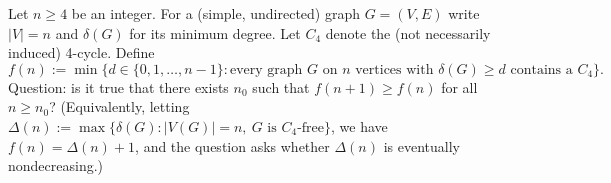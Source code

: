 Let $n\ge 4$ be an integer. For a (simple, undirected) graph $G=(V,E)$ write $|V|=n$ and $\delta(G)$ for its minimum degree. Let $C_4$ denote the (not necessarily induced) 4-cycle.
Define
\[
 f(n) := \min\big\{ d\in\{0,1,\dots,n-1\} : \text{every graph }G\text{ on }n\text{ vertices with }\delta(G)\ge d\text{ contains a }C_4\big\}.
\]
Question: is it true that there exists $n_0$ such that $f(n+1)\ge f(n)$ for all $n\ge n_0$?
(Equivalently, letting $\Delta(n):=\max\{\delta(G): |V(G)|=n,\ G\text{ is }C_4\text{-free}\}$, we have $f(n)=\Delta(n)+1$, and the question asks whether $\Delta(n)$ is eventually nondecreasing.)
